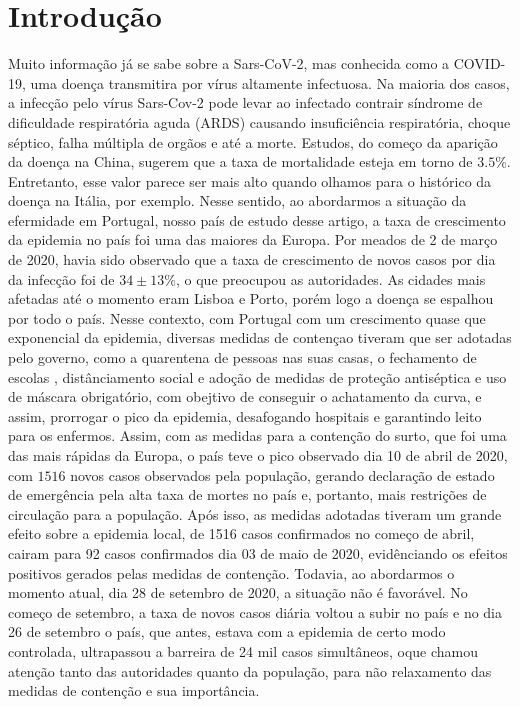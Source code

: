 \documentclass[12pt]{article}
\begin{document}
{\large \section{Introdução} }
Muito informação já se sabe sobre a Sars-CoV-2, mas conhecida como a COVID-19, uma doença transmitira por vírus altamente infectuosa. Na maioria dos casos, a infecção pelo vírus Sars-Cov-2 pode levar ao infectado contrair síndrome de dificuldade respiratória aguda (ARDS) causando insuficiência respiratória, choque séptico, falha múltipla de orgãos e até a morte. Estudos, do começo da aparição da doença na China, sugerem que a taxa de mortalidade esteja em torno de $3.5\%$. Entretanto, esse valor parece ser mais alto quando olhamos para o histórico da doença na Itália, por exemplo.
\newline
\newline
Nesse sentido, ao abordarmos a situação da efermidade em Portugal, nosso país de estudo desse artigo, a taxa de crescimento da epidemia no país foi uma das maiores da Europa. Por meados de 2 de março de 2020, havia sido observado que a taxa de crescimento de novos casos por dia da infecção foi de $34\pm13\%$, o que preocupou as autoridades. As cidades mais afetadas até o momento eram Lisboa e Porto, porém logo a doença se espalhou por todo o país.
Nesse contexto, com Portugal com um crescimento quase que exponencial da epidemia, diversas medidas de contençao tiveram que ser adotadas pelo governo, como a quarentena de pessoas nas suas casas, o fechamento de escolas \cite{fechamento_escolas}, distânciamento social e adoção de medidas de proteção antiséptica e uso de máscara obrigatório, com obejtivo de conseguir o achatamento da curva, e assim, prorrogar o pico da epidemia, desafogando hospitais e garantindo leito para os enfermos. 
\newline
\newline
Assim, com as medidas para a contenção do surto, que foi uma das mais rápidas da Europa, o país teve o pico observado dia 10 de abril de 2020, com $1516$ novos casos observados pela população, gerando declaração de estado de emergência pela alta taxa de mortes no país \cite{altasmortes} e, portanto, mais restrições de circulação para a população.
Após isso, as medidas adotadas tiveram um grande efeito sobre a epidemia local, de 1516 casos confirmados no começo de abril, cairam para 92 casos confirmados dia 03 de maio de 2020, evidênciando os efeitos positivos gerados pelas medidas de contenção.
Todavia, ao abordarmos o momento atual, dia 28 de setembro de 2020, a situação não é favorável. No começo de setembro, a taxa de novos casos diária voltou a subir no país e no dia 26 de setembro o país, que antes, estava com a epidemia de certo modo controlada, ultrapassou a barreira de 24 mil casos simultâneos, oque chamou atenção tanto das autoridades quanto da população, para não relaxamento das medidas de contenção e sua importância.
\end{document}
